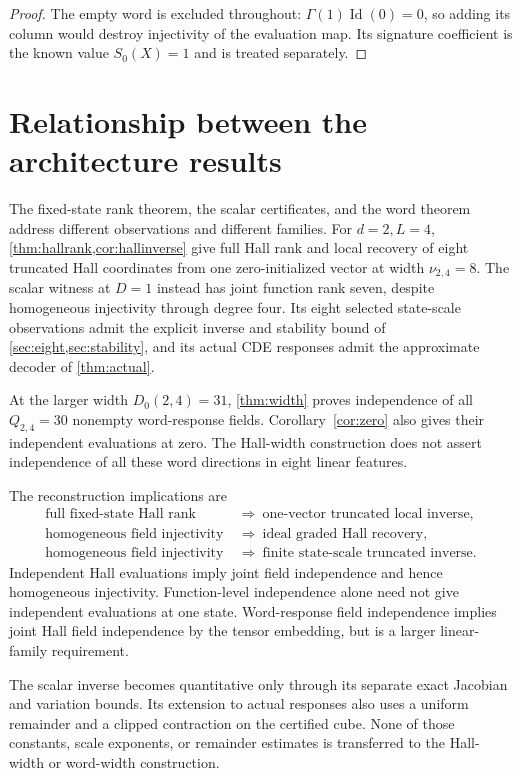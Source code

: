 \documentclass[11pt,a4paper]{article}
\numberwithin{equation}{section}
\theoremstyle{definition}
\theoremstyle{remark}
\DeclareMathOperator{\Id}{Id}
\begin{document}
\begin{proof}
The empty word is excluded throughout: $\Gamma(1)\Id(0)=0$, so adding
its column would destroy injectivity of the evaluation map. Its signature
coefficient is the known value $S_0(X)=1$ and is treated separately.
\end{proof}

\section{Relationship between the architecture results}
\label{sec:comparison}
The fixed-state rank theorem, the scalar certificates, and the word
theorem address different observations and different families.
For $d=2,L=4$, \cref{thm:hallrank,cor:hallinverse} give full Hall rank
and local recovery of eight truncated Hall coordinates from one
zero-initialized vector at width $\nu_{2,4}=8$. The scalar witness at
$D=1$ instead has joint function rank seven, despite homogeneous
injectivity through degree four. Its eight selected state-scale
observations admit the explicit inverse and stability bound of
\cref{sec:eight,sec:stability}, and its actual CDE responses admit
the approximate decoder of \cref{thm:actual}.

At the larger width $D_0(2,4)=31$, \cref{thm:width} proves independence
of all $Q_{2,4}=30$ nonempty word-response fields.
Corollary~\ref{cor:zero} also gives their independent evaluations at zero.
The Hall-width construction does not assert independence of all these
word directions in eight linear features.

The reconstruction implications are
\begin{align*}
 \text{full fixed-state Hall rank}
 &\ \Longrightarrow\ \text{one-vector truncated local inverse},\\
 \text{homogeneous field injectivity}
 &\ \Longrightarrow\ \text{ideal graded Hall recovery},\\
 \text{homogeneous field injectivity}
 &\ \Longrightarrow\ \text{finite state-scale truncated inverse}.
\end{align*}
Independent Hall evaluations imply joint field independence and hence
homogeneous injectivity. Function-level independence alone need not give
independent evaluations at one state. Word-response field independence
implies joint Hall field independence by the tensor embedding, but is a
larger linear-family requirement.

The scalar inverse becomes quantitative only through its separate exact
Jacobian and variation bounds. Its extension to actual responses also
uses a uniform remainder and a clipped contraction on the certified
cube. None of those constants, scale exponents, or remainder estimates
is transferred to the Hall-width or word-width construction.
\end{document}

